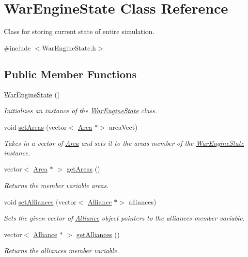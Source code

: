\hypertarget{classWarEngineState}{}\section{War\+Engine\+State Class Reference}
\label{classWarEngineState}


Class for storing current state of entire simulation.  




{\ttfamily \#include $<$War\+Engine\+State.\+h$>$}

\subsection*{Public Member Functions}
\begin{DoxyCompactItemize}
\item 
\mbox{\label{classWarEngineState_a78b3ab46445c7abc7797531004cd6d67}} 
\hyperlink{classWarEngineState_a78b3ab46445c7abc7797531004cd6d67}{War\+Engine\+State} ()
\begin{DoxyCompactList}\small\item\em Initializes an instance of the \hyperlink{classWarEngineState}{War\+Engine\+State} class. \end{DoxyCompactList}\item 
void \hyperlink{classWarEngineState_a5cb156803af207c0498a8e1d33972cd8}{set\+Areas} (vector$<$ \hyperlink{classArea}{Area} $\ast$$>$ area\+Vect)
\begin{DoxyCompactList}\small\item\em Takes in a vector of \hyperlink{classArea}{Area} and sets it to the areas member of the \hyperlink{classWarEngineState}{War\+Engine\+State} instance. \end{DoxyCompactList}\item 
vector$<$ \hyperlink{classArea}{Area} $\ast$ $>$ \hyperlink{classWarEngineState_a9f6f2aef902096c80a0014ff5466915c}{get\+Areas} ()
\begin{DoxyCompactList}\small\item\em Returns the member variable areas. \end{DoxyCompactList}\item 
void \hyperlink{classWarEngineState_ad7ec9ef65bbbf550b6566a54b7938136}{set\+Alliances} (vector$<$ \hyperlink{classAlliance}{Alliance} $\ast$$>$ alliances)
\begin{DoxyCompactList}\small\item\em Sets the given vector of \hyperlink{classAlliance}{Alliance} object pointers to the alliances member variable. \end{DoxyCompactList}\item 
vector$<$ \hyperlink{classAlliance}{Alliance} $\ast$ $>$ \hyperlink{classWarEngineState_aa88851d165886c80521e93c2d74338d5}{get\+Alliances} ()
\begin{DoxyCompactList}\small\item\em Returns the alliances member variable. \end{DoxyCompactList}\end{DoxyCompactItemize}


